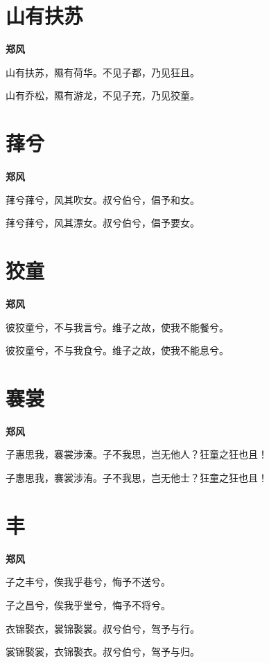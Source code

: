 \documentclass[12pt,a4paper]{ctexbook}
\begin{document}
\section{山有扶苏}
\textbf{郑风}\par\vspace{0.5em}
山有扶苏，隰有荷华。不见子都，乃见狂且。\par
山有乔松，隰有游龙，不见子充，乃见狡童。\par

\section{萚兮}
\textbf{郑风}\par\vspace{0.5em}
萚兮萚兮，风其吹女。叔兮伯兮，倡予和女。\par
萚兮萚兮，风其漂女。叔兮伯兮，倡予要女。\par

\section{狡童}
\textbf{郑风}\par\vspace{0.5em}
彼狡童兮，不与我言兮。维子之故，使我不能餐兮。\par
彼狡童兮，不与我食兮。维子之故，使我不能息兮。\par

\section{褰裳}
\textbf{郑风}\par\vspace{0.5em}
子惠思我，褰裳涉溱。子不我思，岂无他人？狂童之狂也且！\par
子惠思我，褰裳涉洧。子不我思，岂无他士？狂童之狂也且！\par

\section{丰}
\textbf{郑风}\par\vspace{0.5em}
子之丰兮，俟我乎巷兮，悔予不送兮。\par
子之昌兮，俟我乎堂兮，悔予不将兮。\par
衣锦褧衣，裳锦褧裳。叔兮伯兮，驾予与行。\par
裳锦褧裳，衣锦褧衣。叔兮伯兮，驾予与归。\par
\end{document}
